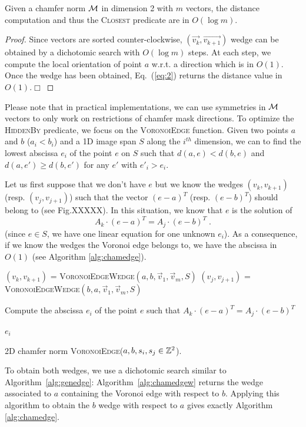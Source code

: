 \documentclass{llncs}
\begin{document}
\begin{lemma}
\label{lem:log}
  Given a chamfer norm $\mathcal{M}$ in dimension 2 with $m$ vectors, the distance computation
  and thus the \textsc{Closest} predicate are in $O(\log{m})$.
\end{lemma}
\begin{proof}
  Since vectors are sorted counter-clockwise,
  $(\vec{v_k},\vec{v_{k+1}})$ wedge can be obtained by a dichotomic
  search with $O(\log{m})$ steps. At each step, we compute the local
  orientation of point $a$ w.r.t. a direction which is in $O(1)$. Once
  the wedge has been obtained, Eq.~(\ref{eq:2}) returns the distance
  value in $O(1)$.$\Box$
\end{proof}

Please note that in practical implementations, we can use symmetries
in $\mathcal{M}$ vectors to only work on restrictions of chamfer mask
directions.  To optimize the \textsc{HiddenBy} predicate, we focus on
the \textsc{VoronoiEdge} function. Given two points $a$ and $b$
($a_i<b_i$) and a 1D image span $S$ along the $i^{th}$ dimension, we
can to find the lowest abscissa $e_i$ of the point $e$ on $S$ such
that $d(a,e) < d(b,e)$ and $d(a,e')\geq d(b, e')$ for any $e'$ with
$e'_i>e_i$.

Let us first suppose that we don't have $e$ but we know the wedges
$(v_{k},v_{k+1})$ (resp. $(v_j,v_{j+1})$) such that the vector
$(e-a)^T$ (resp. $(e-b)^T$) should belong to (see Fig.XXXXX). In this
situation, we know that $e$ is the solution of
\begin{equation}
\label{eq:3}
  A_k\cdot  (e-a)^T = A_j\cdot (e -b)^T\;.
\end{equation}
(since $e\in S$, we have one linear equation for one unknown
$e_i$). As a consequence, if we know the wedges the Voronoi edge
belongs to, we have the abscissa in $O(1)$ (see Algorithm \ref{alg:chamedge}).
\begin{algorithm}[h]\footnotesize
  $(v_k,v_{k+1})$ = \textsc{VoronoiEdgeWedge}$(a,b,\vec{v}_1,\vec{v}_m, S)$\;
  $(v_j,v_{j+1})$ = \textsc{VoronoiEdgeWedge}$(b,a,\vec{v}_1,\vec{v}_m, S)$\;

  Compute the abscissa $e_i$ of the point $e$ such that $A_k\cdot
  (e-a)^T = A_j\cdot (e -b)^T$\;

  \Return $e_i$\;
  \caption{2D chamfer norm \textsc{VoronoiEdge}($a,b,s_i,s_j\in{\mathbb{Z}}^2$).\label{alg:chamedge}}
\end{algorithm}
To obtain both wedges, we use a dichotomic search similar to
Algorithm~\ref{alg:genedge}: Algorithm~\ref{alg:chamedgew} returns the
wedge associated to $a$ containing the Voronoi edge with respect to
$b$. Applying this algorithm to obtain the $b$ wedge with respect to
$a$ gives exactly  Algorithm \ref{alg:chamedge}.
\end{document}
